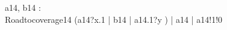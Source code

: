 \begin{circus}
\circchannel a14, b14 : \nat \cross \nat \\
\circprocess Roadtocoverage14 \circdef \circbegin
	\circspot
	    (a14?x.1 \then \Skip \lpar | \lchanset b14 \rchanset | \rpar a14.1?y \then \Skip) \lpar | \lchanset a14 \rchanset | \rpar a14!1!0 \then \Skip \\
	\circend
\end{circus}

